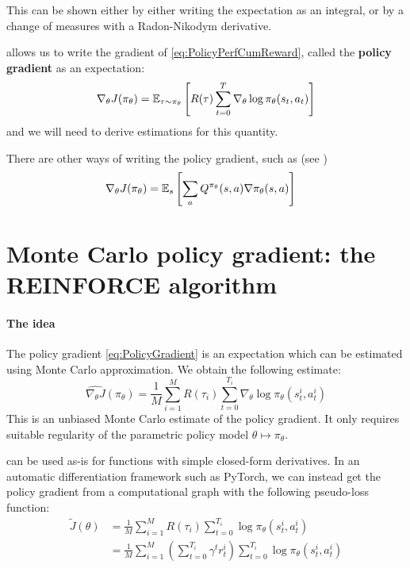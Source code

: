 \documentclass[../course-notes.tex]{subfiles}
\begin{document}
This can be shown either by either writing the expectation as an integral, or by a change of measures with a Radon-Nikodym derivative.

 allows us to write the gradient of \eqref{eq:PolicyPerfCumReward}, called the \textbf{\bluefont policy gradient} as an expectation:
\begin{equation}\label{eq:PolicyGradient}
\nabla_\theta J(\pi_\theta) =
\operatorname{\mathbb{E}}_{\tau\sim\pi_\theta}\left[
R(\tau)\sum_{t=0}^T\nabla_\theta \log\pi_\theta(s_t, a_t)
\right]
\end{equation}
and we will need to derive estimations for this quantity.

There are other ways of writing the policy gradient, such as (see \cite[][chap.\ 13]{Sutton1998})
\begin{align*}
\nabla_\theta J(\pi_\theta)
&=
\operatorname{\mathbb{E}}_s\left[
\sum_a Q^{\pi_\theta}(s,a) \nabla\pi_\theta(s,a)
\right]
\end{align*}




\section{Monte Carlo policy gradient: the REINFORCE algorithm}

\paragraph{The idea} The policy gradient \eqref{eq:PolicyGradient} is an expectation which can be estimated using Monte Carlo approximation. We obtain the following estimate:
\begin{equation}\label{eq:MCPolicyGrad}
\widehat{\nabla_\theta J}(\pi_\theta) =
\frac{1}{M}\sum_{i=1}^M R(\tau_i)
\sum_{t=0}^{T_i}
\nabla_\theta
\log\pi_\theta(s_t^i, a_t^i)
\end{equation}
This is an unbiased Monte Carlo estimate of the policy gradient. It only requires suitable regularity of the parametric policy model $\theta \longmapsto \pi_\theta$.


\begin{remark}\label{rmk:PolicyGradPseudoLoss}  can be used as-is for functions with simple closed-form derivatives.
	In an automatic differentiation framework such as {\normalfont\sffamily PyTorch}, we can instead get the policy gradient from a computational graph with the following pseudo-loss function:
	\begin{equation}\label{eq:PolicyGradPseudoLoss}
	\begin{aligned}
	\tilde{J}(\theta)
	&= \frac{1}{M}\sum_{i=1}^M R(\tau_i)
	\sum_{t=0}^{T_i} \log\pi_\theta(s_t^i, a_t^i)\\
	&=
	\frac{1}{M}\sum_{i=1}^M
	\left(
	\sum_{t=0}^{T_i} \gamma^t r^i_{t}
	\right)
	\sum_{t=0}^{T_i} \log\pi_\theta(s_t^i, a_t^i)
	\end{aligned}
	\end{equation}
\end{remark}
\end{document}
